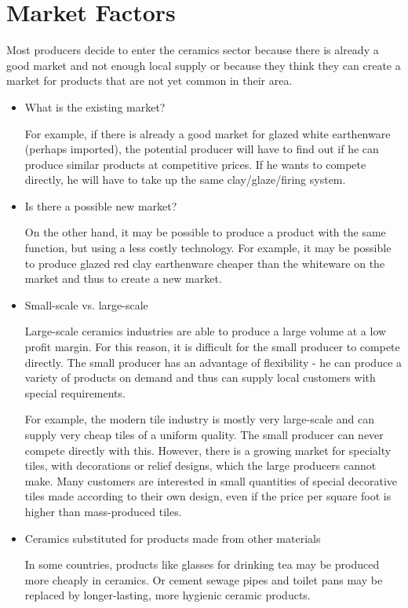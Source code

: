 \section{Market Factors}
Most producers decide to enter the ceramics sector because there is already a 
good market and not enough local supply or because they think they can create a 
market for products that are not yet common in their area.
\begin{itemize}
\item What is the existing market?

For example, if there is already a good market for glazed white earthenware 
(perhaps imported), the potential producer will have to find out if he can 
produce similar products at competitive prices. If he wants to compete 
directly, he will have to take up the same clay/glaze/firing system.

\item Is there a possible new market?

On the other hand, it may be possible to produce a product with the same 
function, but using a less costly technology. For example, it may be possible 
to produce glazed red clay earthenware cheaper than the whiteware on the market 
and thus to create a new market.

\item Small-scale vs. large-scale

Large-scale ceramics industries are able to produce a large volume at a low 
profit margin. For this reason, it is difficult for the small producer to 
compete directly. The small producer has an advantage of flexibility - he can 
produce a variety of products on demand and thus can supply local customers 
with special requirements.

For example, the modern tile industry is mostly very large-scale and can supply 
very cheap tiles of a uniform quality. The small producer can never compete 
directly with this. However, there is a growing market for specialty tiles, 
with decorations or relief designs, which the large producers cannot make. Many 
customers are interested in small quantities of special decorative tiles made 
according to their own design, even if the price per square foot is higher than 
mass-produced tiles.

\item Ceramics substituted for products made from other materials

In some countries, products like glasses for drinking tea may be produced more 
cheaply in ceramics. Or cement sewage pipes and toilet pans may be replaced by 
longer-lasting, more hygienic ceramic products.
\end{itemize}
